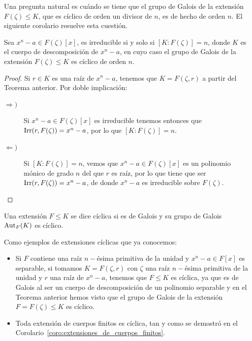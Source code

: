 Una pregunta natural es cuándo se tiene que el grupo de Galois de la extensión $F(\zeta)\leq K$, que es cíclico de orden un divisor de $n$, es de hecho de orden $n$. El siguiente corolario resuelve esta cuestión.
\begin{coro}
    Sea $x^n-a\in F(\zeta)[x]$, es irreducible si y solo si $[K:F(\zeta)] = n$, donde $K$ es el cuerpo de descomposición de $x^n-a$, en cuyo caso el grupo de Galois de la extensión $F(\zeta)\leq K$ es cíclico de orden $n$.
    \begin{proof}
        Si $r\in K$ es una raíz de $x^n-a$, tenemos que $K = F(\zeta,r)$ a partir del Teorema anterior. Por doble implicación:
        \begin{description}
            \item[$\Longrightarrow )$] Si $x^n-a\in F(\zeta)[x]$ es irreducible tenemos entonces que $\operatorname{Irr}(r,F(\zeta)) = x^n-a$, por lo que $[K:F(\zeta)]= n$.
            \item[$\Longleftarrow )$] Si $[K:F(\zeta)] = n$, vemos que $x^n-a\in F(\zeta)[x]$ es un polinomio mónico de grado $n$ del que $r$ es raíz, por lo que tiene que ser $\operatorname{Irr}(r,F(\zeta)) = x^n-a$, de donde $x^n-a$ es irreducible sobre $F(\zeta)$.
        \end{description}
    \end{proof}
\end{coro}

\begin{definicion}
    Una extensión $F\leq K$ se dice cíclica si es de Galois y su grupo de Galois $\operatorname{Aut}_F(K)$ es cíclico.
\end{definicion}

\begin{ejemplo}
    Como ejemplos de extensiones cíclicas que ya conocemos:
    \begin{itemize}
        \item Si $F$ contiene una raíz $n-$ésima primitiva de la unidad y $x^n-a\in F[x]$ es separable, si tomamos $K=F(\zeta,r)$ con $\zeta$ una raíz $n-$ésima primitiva de la unidad y $r$ una raíz de $x^n-a$, tenemos que $F\leq K$ es cíclica, ya que es de Galois al ser un cuerpo de descomposición de un polinomio separable y en el Teorema anterior hemos visto que el grupo de Galois de la extensión $F=F(\zeta)\leq K$  es cíclico.
        \item Toda extensión de cuerpos finitos es cíclica, tan y como se demostró en el Corolario~\ref{coro:extensiones_de_cuerpos_finitos}.
    \end{itemize}
\end{ejemplo}

